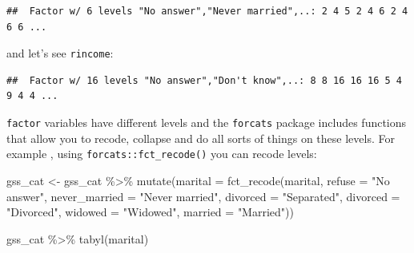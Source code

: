 \documentclass[
]{article}
\newenvironment{Shaded}{\begin{snugshade}}{\end{snugshade}}
\newcommand{\AttributeTok}[1]{\textcolor[rgb]{0.77,0.63,0.00}{#1}}
\newcommand{\FunctionTok}[1]{\textcolor[rgb]{0.00,0.00,0.00}{#1}}
\newcommand{\NormalTok}[1]{#1}
\newcommand{\OtherTok}[1]{\textcolor[rgb]{0.56,0.35,0.01}{#1}}
\newcommand{\SpecialCharTok}[1]{\textcolor[rgb]{0.00,0.00,0.00}{#1}}
\newcommand{\StringTok}[1]{\textcolor[rgb]{0.31,0.60,0.02}{#1}}
\begin{document}
\begin{Shaded}
\end{Shaded}

\begin{verbatim}
##  Factor w/ 6 levels "No answer","Never married",..: 2 4 5 2 4 6 2 4 6 6 ...
\end{verbatim}

and let's see \texttt{rincome}:

\begin{Shaded}
\end{Shaded}

\begin{verbatim}
##  Factor w/ 16 levels "No answer","Don't know",..: 8 8 16 16 16 5 4 9 4 4 ...
\end{verbatim}

\texttt{factor} variables have different levels and the \texttt{forcats} package includes functions that allow
you to recode, collapse and do all sorts of things on these levels. For example , using
\texttt{forcats::fct\_recode()} you can recode levels:

\begin{Shaded}
\begin{Highlighting}[]
\NormalTok{gss\_cat }\OtherTok{\textless{}{-}}\NormalTok{ gss\_cat }\SpecialCharTok{\%\textgreater{}\%}
  \FunctionTok{mutate}\NormalTok{(}\AttributeTok{marital =} \FunctionTok{fct\_recode}\NormalTok{(marital,}
                              \AttributeTok{refuse =} \StringTok{"No answer"}\NormalTok{,}
                              \AttributeTok{never\_married =} \StringTok{"Never married"}\NormalTok{,}
                              \AttributeTok{divorced =} \StringTok{"Separated"}\NormalTok{,}
                              \AttributeTok{divorced =} \StringTok{"Divorced"}\NormalTok{,}
                              \AttributeTok{widowed =} \StringTok{"Widowed"}\NormalTok{,}
                              \AttributeTok{married =} \StringTok{"Married"}\NormalTok{))}

\NormalTok{gss\_cat }\SpecialCharTok{\%\textgreater{}\%}
  \FunctionTok{tabyl}\NormalTok{(marital)}
\end{Highlighting}
\end{Shaded}
\end{document}
